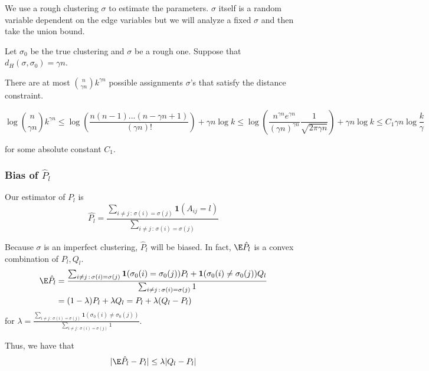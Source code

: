 \documentclass{article}
\begin{document}
We use a rough clustering $\sigma$ to estimate the parameters. $\sigma$ itself is a random variable dependent on the edge variables but we will analyze a fixed $\sigma$ and then take the union bound.

Let $\sigma_0$ be the true clustering and $\sigma$ be a rough one. 
Suppose that $d_H(\sigma, \sigma_0) = \gamma n$.

There are at most $\binom{n}{\gamma n} k^{\gamma n}$ possible assignments $\sigma$'s that satisfy the distance constraint. 

\[
\log \binom{n}{\gamma n} k^{\gamma n} \leq 
  \log \left( \frac{ n(n-1) ...(n-\gamma n+1) }{(\gamma n)!} \right) + \gamma n \log k \leq
  \log \left( \frac{ n^{\gamma n} e^{\gamma n} }
     { (\gamma n)^{\gamma n} } \frac{1}{\sqrt{2\pi \gamma n}} \right) + \gamma n \log k 
 \leq C_1 \gamma n \log \frac{k}{\gamma} 
\]

for some absolute constant $C_1$. 

\subsubsection{Bias of $\hat{P}_l$}


Our estimator of $P_l$ is 
\[
\hat{P_l} = \frac{ \sum_{i \neq j \,:\, \sigma(i) = \sigma(j)} \mathbf{1}(A_{ij} = l) }{
                   \sum_{i \neq j \,:\, \sigma(i) = \sigma(j)} }
\]

Because $\sigma$ is an imperfect clustering, $\hat{P}_l$ will be biased. In fact, $\E \hat{P}_l$ is a convex combination of $P_l, Q_l$. 
\begin{align}
\E \hat{P_l} &= 
   \frac{ \sum_{i \neq j \,:\, \sigma(i) = \sigma(j)} 
             \mathbf{1}(\sigma_0(i) = \sigma_0(j) ) P_l + 
               \mathbf{1}(\sigma_0(i) \neq \sigma_0(j)) Q_l }{
                   \sum_{i \neq j \,:\, \sigma(i) = \sigma(j)} 1 } \nonumber \\
  &= (1 - \lambda) P_l + \lambda Q_l  = P_l + \lambda (Q_l - P_l) \label{eqn:bias_simple_bound}
\end{align}
for $\lambda = \frac{\sum_{i \neq j \,:\, \sigma(i) = \sigma(j)} 
     \mathbf{1}(\sigma_0(i) \neq \sigma_0(j)) }{\sum_{i \neq j \,:\, \sigma(i) = \sigma(j)} 1}$.

Thus, we have that 
\[
|\E \hat{P}_l - P_l | \leq \lambda |Q_l - P_l|
\]
\end{document}
